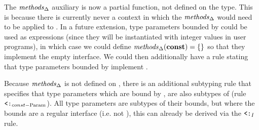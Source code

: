 The $\mathit{methods}_\Delta$ auxiliary is now a partial function, not defined on the
 type. This is because there is currently never a context in which the
$\mathit{methods}_\Delta$ would need to be applied to . In a future extension,
type parameters bounded by  could be used as expressions (since they will
be instantiated with integer values in user programs), in which case we could
define $\mathit{methods}_\Delta(\texttt{\bf const}) = \{\}$ so that they implement the empty
interface. We could then additionally have a rule stating that type parameters
bounded by  implement .

Because $\mathit{methods}_\Delta$ is not defined on , there is an additional
subtyping rule that specifies that type parameters which are bound by
, are also subtypes of  (rule $\mathbin{\texttt{<:}}_{const-\text{Param}}$).
All type parameters are subtypes of their bounds, but where the bounds are a
regular interface (i.e. not ), this can already be derived via the
$\mathbin{\texttt{<:}}_I$ rule.



